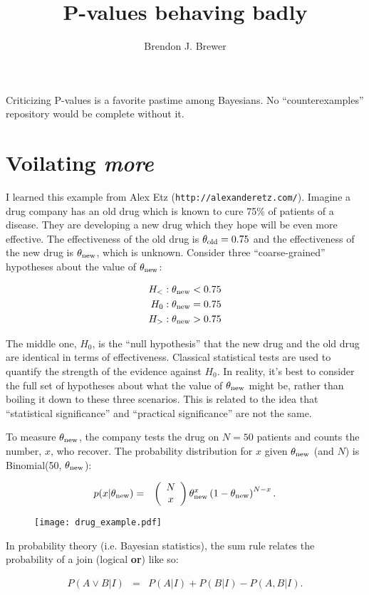 \documentclass[a4paper, 12pt]{article}
\title{P-values behaving badly}
\author{Brendon J. Brewer}
\begin{document}
\maketitle

Criticizing P-values is a favorite pastime among Bayesians. No
``counterexamples'' repository would be complete without it.

\section{Voilating {\em more}}
I learned this example from Alex Etz ({\tt http://alexanderetz.com/}).
Imagine a drug company has an old drug which is known to cure
75\% of patients of a disease. They are developing a new drug
which they hope will be even more effective.
The effectiveness of the old drug is $\theta_{\rm old} = 0.75$ and the
effectiveness of the new drug is $\theta_{\rm new}$, which is unknown.
Consider three ``coarse-grained''
hypotheses about the value of $\theta_{\rm new}$:

\begin{eqnarray}
H_<: \theta_{\rm new} < 0.75\\
H_0: \theta_{\rm new} = 0.75\\
H_>: \theta_{\rm new} > 0.75
\end{eqnarray}

The middle one, $H_0$, is the ``null hypothesis'' that the new drug and the
old drug are identical in terms of effectiveness. Classical statistical tests
are used to quantify the strength of the evidence against $H_0$. In reality,
it's best to consider the full set of hypotheses about what the value of
$\theta_{\rm new}$ might be, rather than boiling it down to these three
scenarios. This is related to the idea
that ``statistical significance'' and ``practical significance'' are not the
same.

To measure $\theta_{\rm new}$, the company tests the drug on $N=50$ patients
and counts the number, $x$, who recover. The probability distribution for
$x$ given $\theta_{\rm new}$ (and $N$) is Binomial(50, $\theta_{\rm new}$):

\begin{eqnarray}
p(x | \theta_{\rm new}) &=&
\left(\begin{array}{cc}N \\ x\end{array}\right)
\theta_{\rm new}^x \left(1 - \theta_{\rm new}\right)^{N - x}.
\end{eqnarray}

\begin{figure}[ht!]
\centering
\texttt{[image: drug\_example.pdf]}
\caption{\label{fig:drug_example}}
\end{figure}

In probability theory (i.e. Bayesian statistics), the sum rule relates the
probability of a join (logical {\bf or}) like so:

\begin{eqnarray}
P(A \vee B | I) &=& P(A | I) + P(B | I) - P(A, B | I).
\end{eqnarray}
\end{document}
